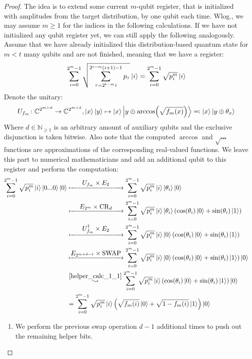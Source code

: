 \begin{proof}
    The idea is to extend some current \(m\)-qubit register, that is initialized with amplitudes from the target distribution, by one qubit each time. Wlog., we may assume \(m \geq 1\) for the indices in the following calculations. If we have not initialized any qubit register yet, we can still apply the following analogously. Assume that we have already initialized this distribution-based quantum state for \(m < t\) many qubits and are not finished, meaning that we have a register:
    \begin{align}
        \sum_{i = 0}^{2^m-1} \sqrt{\sum_{\tau = 2^{t-m}i}^{2^{t-m}(i+1)-1} p_\tau} \ket{i} = \sum_{i=0}^{2^m-1} \sqrt{p_i^m} \ket{i}
    \end{align}
    Denote the unitary:
    \begin{align}
        U_{f_m}\colon \mathbb{C}^{2^{m+d}} \to \mathbb{C}^{2^{m+d}}, \ket{x}\ket{y} \mapsto \ket{x}\ket{y \oplus \arccos(\sqrt{f_m(x)})} \eqqcolon \ket{x}\ket{y \oplus \theta_x}
    \end{align}
    Where \(d \in \mathbb{N}_{\geq 1}\) is an arbitrary amount of auxiliary qubits and the exclusive disjunction is taken bitwise. Also note that the computed \(\arccos\) and \(\sqrt{...}\) functions are approximations of the corresponding real-valued functions. We leave this part to numerical mathematicians and add an additional qubit to this register and perform the computation:
    \begin{align}
        \sum_{i=0}^{2^m-1} \sqrt{p_i^m}\ket{i}\ket{0...0}\ket{0} &\xmapsto{\parbox{2.75cm}{\centering \(U_{f_m} \times E_2\)}} \sum_{i=0}^{2^m-1}\sqrt{p_i^m}\ket{i}\ket{\theta_i}\ket{0}\\
        &\xmapsto{\parbox{2.75cm}{\centering \(E_{2^m} \times \controrot_d\)}} \sum_{i=0}^{2^m-1}\sqrt{p_i^m}\ket{i}\ket{\theta_i}(\cos(\theta_i)\ket{0}+\sin(\theta_i)\ket{1})\\
        &\xmapsto{\parbox{2.75cm}{\centering \(U_{f_m}^\dagger \times E_2\)}} \sum_{i=0}^{2^m-1}\sqrt{p_i^m}\ket{i}\ket{0}(\cos(\theta_i)\ket{0}+\sin(\theta_i)\ket{1})\\
        &\xmapsto{\parbox{2.75cm}{\centering \(E_{2^{m+d-1}} \times \swapgate\)}} \sum_{i=0}^{2^m-1}\sqrt{p_i^m}\ket{i}\ket{0}(\cos(\theta_i)\ket{0}+\sin(\theta_i)\ket{1})\ket{0}\\
        &\overset{\ref{helper_calc_1_1}}{\leadsto} \sum_{i=0}^{2^m-1}\sqrt{p_i^m}\ket{i}(\cos(\theta_i)\ket{0}+\sin(\theta_i)\ket{1})\ket{0}\\
        &= \sum_{i=0}^{2^m-1}\sqrt{p_i^m}\ket{i}\left(\sqrt{f_m(i)}\ket{0}+\sqrt{1-f_m(i)}\ket{1}\right)\ket{0}
    \end{align}
    \begin{enumerate}[label=(\arabic*)]
        \item \label{helper_calc_1_1} We perform the previous swap operation \(d-1\) additional times to push out the remaining helper bits.
    \end{enumerate}


\end{proof}
